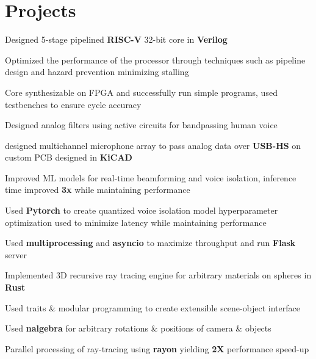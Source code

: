 \documentclass[]{chandan-cv}
\begin{document}
\begin{minipage}[t]{0.77\textwidth}

\section{Projects}

\descript{ }
\location{ }
\begin{tightemize}
	\item Designed 5-stage pipelined \textbf{RISC-V} 32-bit core in \textbf{Verilog}
	\item Optimized the performance of the processor through techniques such as pipeline design and hazard prevention minimizing stalling 
	\item Core synthesizable on FPGA and successfully run simple programs, used testbenches to ensure cycle accuracy 
\end{tightemize}
\sectionsep


\descript{ }
\location{ }
\begin{tightemize}
	\item Designed analog filters using active circuits for bandpassing human voice
	\item designed multichannel microphone array to pass analog data over \textbf{USB-HS} on custom PCB designed in \textbf{KiCAD}
	\item Improved ML models for real-time beamforming and voice isolation, inference time improved \textbf{3x} while maintaining performance
	\item Used \textbf{Pytorch} to create quantized voice isolation model hyperparameter optimization used to minimize latency while maintaining performance 
	\item Used \textbf{multiprocessing} and \textbf{asyncio} to maximize throughput and run \textbf{Flask} server
\end{tightemize}
\sectionsep


\descript{ }
\location{ }
\begin{tightemize}
	\item Implemented 3D recursive ray tracing engine for arbitrary materials on spheres in \textbf{Rust}
	\item Used traits \& modular programming to create extensible scene-object interface
	\item Used \textbf{nalgebra} for arbitrary rotations \& positions of camera \& objects 
	\item Parallel processing of ray-tracing using \textbf{rayon} yielding \textbf{2X} performance speed-up
\end{tightemize}
\sectionsep


\end{minipage}
\end{document}
